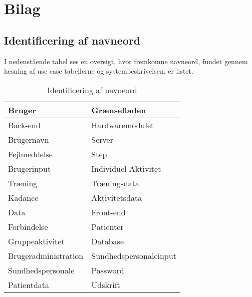 \chapter{Bilag}
\label{chap:navneord}
\section{Identificering af navneord}

I nedenstående tabel ses en oversigt, hvor fremkomne navneord, fundet gennem læsning af use case tabellerne og systembeskrivelsen, er listet. 

\begin{table}[H]
	\centering
	\caption{Identificering af navneord}
	\label{tab:navneord}
	\begin{tabular}{|l|l|}
		\hline
		Bruger               & Grænsefladen             \\ \hline
		Back-end             & Hardwaremodulet        \\ \hline
		Brugernavn           & Server                 \\ \hline
		Fejlmeddelse         & Step                   \\ \hline
		Brugerinput          & Individuel Aktivitet   \\ \hline
		Træning              & Træningsdata           \\ \hline
		Kadance              & Aktivitetsdata         \\ \hline
		Data                 & Front-end              \\ \hline
		Forbindelse          & Patienter              \\ \hline
		Gruppeaktivitet      & Database               \\ \hline
		Brugeradministration & Sundhedspersonaleinput \\ \hline
		Sundhedspersonale    & Password               \\ \hline
		Patientdata          & Udskrift               \\ \hline
	\end{tabular}
\end{table}